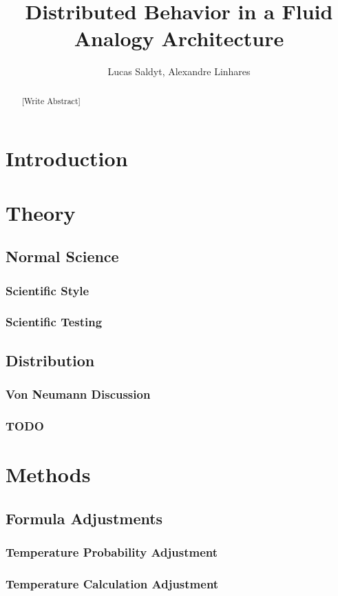 \documentclass[a4paper]{article}
\title{Distributed Behavior in a Fluid Analogy Architecture}
\author{Lucas Saldyt, Alexandre Linhares}
\begin{document}
\maketitle

\begin{abstract}
    [Write Abstract]
\end{abstract}

\section{Introduction}
\section{Theory}
    \subsection{Normal Science}
        \subsubsection{Scientific Style}
        \subsubsection{Scientific Testing}
    \subsection{Distribution}
        \subsubsection{Von Neumann Discussion}
        \subsubsection{TODO}
\section{Methods}
    \subsection{Formula Adjustments}
        \subsubsection{Temperature Probability Adjustment}
        \subsubsection{Temperature Calculation Adjustment}
\end{document}
